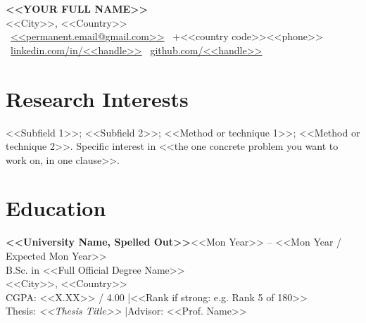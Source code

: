 \documentclass[a4paper,10pt]{article}
\newcommand{\entry}[2]{\textbf{#1}\hfill{#2}\\}
\begin{document}
\pagestyle{empty}

\begin{center}
    {\fontsize{18}{22}\selectfont\textbf{<<YOUR FULL NAME>>}}\\[4pt]
    <<City>>, <<Country>>\\[3pt]
    \faEnvelope\ \href{mailto:<<permanent.email@gmail.com>>}{<<permanent.email@gmail.com>>} \quad
    \faPhone\ +<<country code>><<phone>> \quad
    \faLinkedin\ \href{https://linkedin.com/in/<<handle>>}{linkedin.com/in/<<handle>>} \quad
    \faGithub\ \href{https://github.com/<<handle>>}{github.com/<<handle>>}
\end{center}
\vspace{4pt}

\section{Research Interests}
<<Subfield 1>>; <<Subfield 2>>; <<Method or technique 1>>; <<Method or technique 2>>.
Specific interest in <<the one concrete problem you want to work on, in one clause>>.

\section{Education}
\entry{<<University Name, Spelled Out>>}{<<Mon Year>> -- <<Mon Year / Expected Mon Year>>}
B.Sc. in <<Full Official Degree Name>>\\
<<City>>, <<Country>>\\
CGPA: <<X.XX>> / 4.00 \quad|\quad <<Rank if strong: e.g. Rank 5 of 180>>\\
Thesis: \textit{<<Thesis Title>>} \quad|\quad Advisor: <<Prof. Name>>
\end{document}

